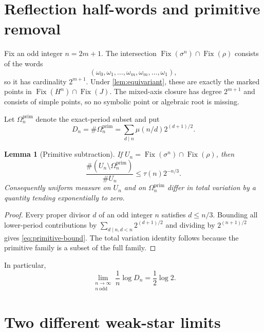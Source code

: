 \documentclass[11pt]{article}
\newtheorem{lemma}[theorem]{Lemma}
\theoremstyle{remark}
\begin{document}
\section{Reflection half-words and primitive removal}

Fix an odd integer $n=2m+1$.  The intersection
$\operatorname{Fix}(\sigma^n)\cap\operatorname{Fix}(\rho)$ consists of the
words
\begin{equation}\label{eq:palindrome}
 (\omega_0,\omega_1,\ldots,\omega_m,
  \omega_m,\ldots,\omega_1),
\end{equation}
so it has cardinality $2^{m+1}$.  Under \cref{lem:equivariant}, these are
exactly the marked points in
$\operatorname{Fix}(H^n)\cap\operatorname{Fix}(J)$.  The mixed-axis closure
has degree $2^{m+1}$ and consists of simple points, so no symbolic point or
algebraic root is missing.

Let $\Omega_n^{\mathrm{prim}}$ denote the exact-period subset and put
\begin{equation}\label{eq:Dn}
 D_n=\#\Omega_n^{\mathrm{prim}}
 =\sum_{d\mid n}\mu(n/d)2^{(d+1)/2}.
\end{equation}

\begin{lemma}[Primitive subtraction]\label{lem:primitive}
If $U_n=\operatorname{Fix}(\sigma^n)\cap\operatorname{Fix}(\rho)$, then
\begin{equation}\label{eq:primitive-bound}
 \frac{\#(U_n\setminus\Omega_n^{\mathrm{prim}})}{\#U_n}
 \le \tau(n)2^{-n/3}.
\end{equation}
Consequently uniform measure on $U_n$ and on
$\Omega_n^{\mathrm{prim}}$ differ in total variation by a quantity tending
exponentially to zero.
\end{lemma}

\begin{proof}
Every proper divisor $d$ of an odd integer $n$ satisfies $d\le n/3$.
Bounding all lower-period contributions by
$\sum_{d\mid n,d<n}2^{(d+1)/2}$ and dividing by $2^{(n+1)/2}$ gives
\eqref{eq:primitive-bound}.  The total variation identity follows because
the primitive family is a subset of the full family.
\end{proof}

In particular,
\begin{equation}\label{eq:entropy}
 \lim_{\substack{n\to\infty\\n\ \mathrm{odd}}}\frac1n\log D_n
 =\frac12\log2.
\end{equation}

\section{Two different weak-star limits}
\end{document}
